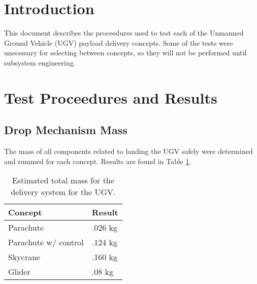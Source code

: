 \documentclass[]{auvsi_doc}
\begin{document}
\begin{AUVSITitlePage}
\begin{artifacttable}

\end{artifacttable}
\end{AUVSITitlePage}

\section{Introduction}
This document describes the proceedures used to test each of the Unmanned Ground Vehicle (UGV) payload delivery concepts.
Some of the tests were unecessary for selecting between concepts, so they will not be performed until subsystem engineering.

\section {Test Proceedures and Results}
	\subsection{Drop Mechanism Mass}

	The mass of all components related to landing the UGV safely were determined and summed for each concept. Results are found in Table \ref{mass}.


	\begin{table}[!h]
	\centering
	
	\caption{Estimated total mass for the delivery system for the UGV.}
\label{mass}
	\begin{tabular}{|l|l|}
		\hline
		\textbf{Concept}       & \textbf{Result} \\
		\hline
		Parachute              & .026 kg                \\
		Parachute w/ control   & .124 kg                \\
		Skycrane               & .160 kg                \\
		Glider                 & .08 kg				 \\
		\hline
	\end{tabular}
	\end{table}
\end{document}
